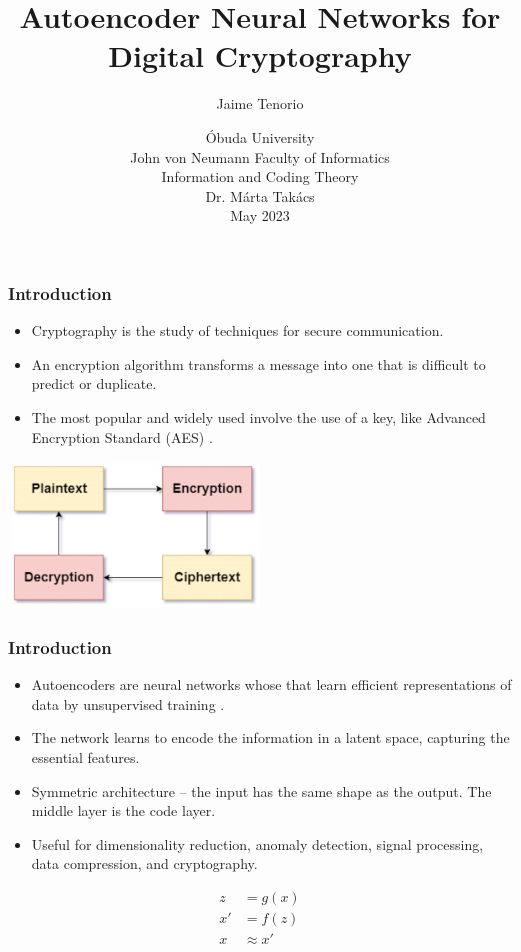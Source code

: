 \documentclass{beamer}
\title{Autoencoder Neural Networks for Digital Cryptography}
\author{Jaime Tenorio}
\date{
    Óbuda University \\
    John von Neumann Faculty of Informatics \\
    Information and Coding Theory \\
    Dr. Márta Takács \\
    May 2023
}
\begin{document}
\maketitle

\begin{frame}
    \frametitle{Introduction}
    \begin{itemize}
        \item Cryptography is the study of techniques for secure communication.
        \item An encryption algorithm transforms a message into one that is difficult to predict or duplicate.
        \item The most popular and widely used involve the use of a key, like Advanced Encryption Standard (AES) \cite{aes}.
    \end{itemize}
    \centering
    \includegraphics[width=0.5\textwidth]{img/cryptodiagram.jpeg}
\end{frame}

\begin{frame}
    \frametitle{Introduction}
    \begin{itemize}
        \item Autoencoders are neural networks whose that learn efficient representations of data by unsupervised training \cite{autoencoder}.
        \item The network learns to encode the information in a latent space, capturing the essential features.
        \item Symmetric architecture -- the input has the same shape as the output. The middle layer is the code layer.
        \item Useful for dimensionality reduction, anomaly detection, signal processing, data compression, and cryptography.
    \end{itemize}
    \begin{equation}\label{eq:autoencoder}
        \begin{split}
            z &= g(x) \\
            x' &= f(z) \\
            x &\approx x' \\
        \end{split}
    \end{equation}
\end{frame}
\end{document}
